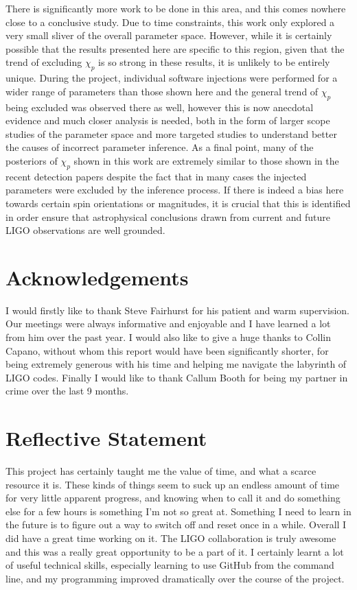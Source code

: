 \documentclass[11pt]{article}
\begin{document}
There is significantly more work to be done in this area, and this comes nowhere close to a conclusive study. Due to time constraints, this work only explored a very small sliver of the overall parameter space. However, while it is certainly possible that the results presented here are specific to this region, given that the trend of excluding $\chi_p$ is so strong in these results, it is unlikely to be entirely unique. During the project, individual software injections were performed for a wider range of parameters than those shown here and the general trend of $\chi_p$ being excluded was observed there as well, however this is now anecdotal evidence and much closer analysis is needed, both in the form of larger scope studies of the parameter space and more targeted studies to understand better the causes of incorrect parameter inference. As a final point, many of the posteriors of $\chi_p$ shown in this work are extremely similar to those shown in the recent detection papers\cite{obs}\cite{obs2} despite the fact that in many cases the injected parameters were excluded by the inference process. If there is indeed a bias here towards certain spin orientations or magnitudes, it is crucial that this is identified in order ensure that astrophysical conclusions drawn from current and future LIGO observations are well grounded.
\section{Acknowledgements}
I would firstly like to thank Steve Fairhurst for his patient and warm supervision. Our meetings were always informative and enjoyable and I have learned a lot from him over the past year. I would also like to give a huge thanks to Collin Capano, without whom this report would have been significantly shorter, for being extremely generous with his time and helping me navigate the labyrinth of LIGO codes. Finally I would like to thank Callum Booth for being my partner in crime over the last 9 months.
\section{Reflective Statement}
This project has certainly taught me the value of time, and what a scarce resource it is. These kinds of things seem to suck up an endless amount of time for very little apparent progress, and knowing when to call it and do something else for a few hours is something I'm not so great at. Something I need to learn in the future is to figure out a way to switch off and reset once in a while. Overall I did have a great time working on it. The LIGO collaboration is truly awesome and this was a really great opportunity to be a part of it. I certainly learnt a lot of useful technical skills, especially learning to use GitHub from the command line, and my programming improved dramatically over the course of the project. 


\end{document}
